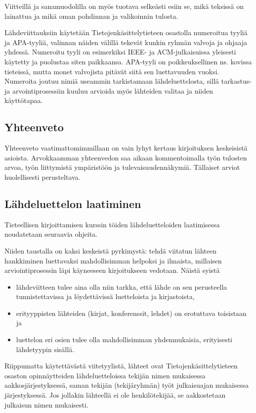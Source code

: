 \documentclass[finnish,gradu]{tktltiki}
\begin{document}
Viitteillä ja sanamuodolilla on
myös tuotava selkeästi esiin se, mikä teksissä on lainattua ja mikä oman
pohdinnan ja valikoinnin tulosta.


Lähdeviittauksiin käytetään Tietojenkäsittelytieteen osastolla
numeroitua tyyliä ja APA-tyyliä, valinnan näiden välillä tekevät kunkin
ryhmän valvoja ja ohjaaja yhdessä. 
Numeroitu tyyli on esimerkiksi IEEE- ja
ACM-julkaisuissa yleisesti käytetty ja puolustaa siten paikkaansa.
APA-tyyli on poikkeuksellinen ns. kovissa tieteissä, mutta monet
valvojista pitävät siitä sen luettavuuden vuoksi. Numeroita joutuu nimiä
useammin tarkistamaan lähdeluettelosta, sillä tarkastus- ja
arvointiprosessiin kuuluu arvioida myös lähteiden valitaa ja niiden
käyttötapaa.





\subsection{Yhteenveto}

Yhteenveto  vaatimattomimmillaan on vain lyhyt kertaus kirjoituksen
keskeisistä asioista. Arvokkaamman yhteenvedon saa aikaan kommentoimalla
 työn tulosten arvoa, työn liittymistä ympäristöön ja
tulevaisuudennäkymiä. Tällaiset arviot  huolellisesti
perusteltava.

\subsection{Lähdeluettelon laatiminen}

Tieteellisen kirjoittamisen kurssin töiden lähdeluetteloiden
laatimisessa noudatetaan seuraavia ohjeita.

Niiden taustalla on kaksi
keskeistä pyrkimystä: tehdä viitatun lähteen hankkiminen luettavaksi
mahdollisimman helpoksi ja ilmaista, millaisen arviointiprosessin
läpi käyneeseen kirjoitukseen vedotaan.
Näistä syistä
\begin{itemize}
\item lähdeviitteen tulee aina olla niin tarkka, että
lähde on sen perusteella tunnistettavissa ja löydettävissä luetteloista
ja kirjastoista,
\item erityyppisten lähteiden (kirjat, konferenssit, lehdet) on erotuttava
toisistaan
ja
\item luettelon eri osien tulee olla mahdollisimman
yhdenmukaisia, erityisesti lähdetyypin sisällä.
\end{itemize}


Riippumatta käytettävästä viitetyylistä, 
lähteet ovat Tietojenkäsittelytieteen osaston opinnäytteiden lähdeluetteloissa tekijän nimen mukaisessa aakkosjärjestyksessä,
saman tekijän (tekijäryhmän) työt julkaisuajan mukaisessa
järjestyksessä. Jos jollakin lähteellä ei ole henkilötekijää, se
aakkostetaan julkaisun nimen mukaisesti. 
\end{document}
